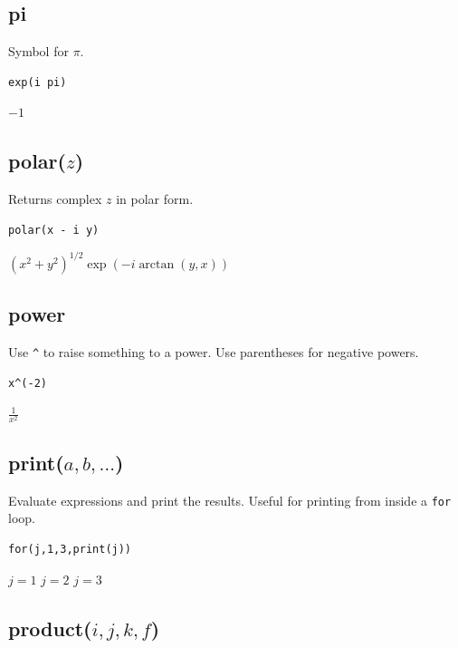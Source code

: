 \documentclass[12pt]{article}
\begin{document}
\subsection*{pi}

Symbol for $\pi$.

{\color{blue}
\begin{verbatim}
exp(i pi)
\end{verbatim}
}

\noindent
$-1$

\subsection*{polar($z$)}

Returns complex $z$ in polar form.

{\color{blue}
\begin{verbatim}
polar(x - i y)
\end{verbatim}
}

\noindent
$\displaystyle (x^2+y^2)^{1/2}\exp(-i\arctan(y,x))$

\subsection*{power}

Use \verb$^$ to raise something to a power.
Use parentheses for negative powers.

{\color{blue}
\begin{verbatim}
x^(-2)
\end{verbatim}
}

\noindent
$\displaystyle \frac{1}{x^2}$

\subsection*{print($a,b,\ldots$)}

Evaluate expressions and print the results.
Useful for printing from inside a {\tt for} loop.

{\color{blue}
\begin{verbatim}
for(j,1,3,print(j))
\end{verbatim}
}

\noindent
$j=1$\newline
$j=2$\newline
$j=3$

\subsection*{product($i,j,k,f$)}
\end{document}
